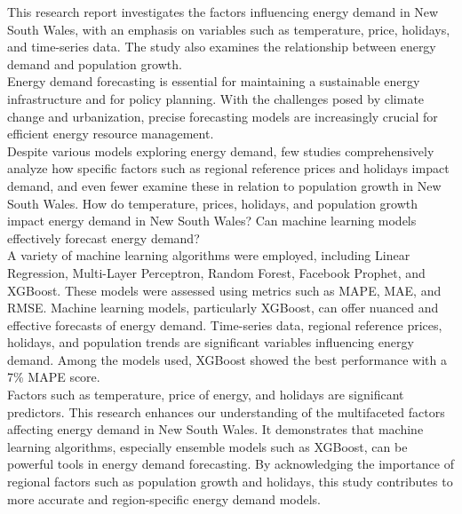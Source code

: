 \documentclass[mstat,12pt]{unswthesis}
\begin{document}
{\bigskip}This research report investigates the factors influencing
energy demand in New South Wales, with an emphasis on variables such as
temperature, price, holidays, and time-series data. The study also
examines the relationship between energy demand and population
growth.\\[1cm] Energy demand forecasting is essential for maintaining a
sustainable energy infrastructure and for policy planning. With the
challenges posed by climate change and urbanization, precise forecasting
models are increasingly crucial for efficient energy resource
management.\\[1cm] Despite various models exploring energy demand, few
studies comprehensively analyze how specific factors such as regional
reference prices and holidays impact demand, and even fewer examine
these in relation to population growth in New South Wales. How do
temperature, prices, holidays, and population growth impact energy
demand in New South Wales? Can machine learning models effectively
forecast energy demand?\\[1cm] A variety of machine learning algorithms
were employed, including Linear Regression, Multi-Layer Perceptron,
Random Forest, Facebook Prophet, and XGBoost. These models were assessed
using metrics such as MAPE, MAE, and RMSE. Machine learning models,
particularly XGBoost, can offer nuanced and effective forecasts of
energy demand. Time-series data, regional reference prices, holidays,
and population trends are significant variables influencing energy
demand. Among the models used, XGBoost showed the best performance with
a 7\% MAPE score.\\[1cm] Factors such as temperature, price of energy,
and holidays are significant predictors. This research enhances our
understanding of the multifaceted factors affecting energy demand in New
South Wales. It demonstrates that machine learning algorithms,
especially ensemble models such as XGBoost, can be powerful tools in
energy demand forecasting. By acknowledging the importance of regional
factors such as population growth and holidays, this study contributes
to more accurate and region-specific energy demand models.\\[1cm] 



\afterpreface





%
%
\end{document}
